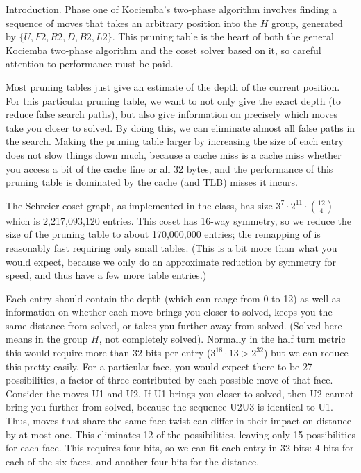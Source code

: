 
\def\mod{\mathop{mod}}


Introduction.
Phase one of Kociemba's two-phase algorithm involves finding a
sequence of moves that takes an arbitrary position into the $H$ group,
generated by $\{U,F2,R2,D,B2,L2\}$.  This pruning table is the heart
of both the general Kociemba two-phase algorithm and the coset solver
based on it, so careful attention to performance must be paid.

Most pruning tables just give an estimate of the depth of the current
position.  For this particular pruning table, we want to not only give
the exact depth (to reduce false search paths), but also give
information on precisely which moves take you closer to solved.  By
doing this, we can eliminate almost all false paths in the search.
Making the pruning table larger by increasing the size of each entry
does not slow things down much, because a cache miss is a cache miss
whether you access a bit of the cache line or all 32 bytes, and the
performance of this pruning table is dominated by the cache (and TLB)
misses it incurs.

The Schreier coset graph, as implemented in the  class, has
size $3^7\cdot 2^{11}\cdot{12\choose 4}$ which is 2,217,093,120
entries.  This coset has 16-way symmetry, so we reduce the size of the
pruning table to about 170,000,000 entries; the remapping of 
is reasonably fast requiring only small tables.  (This is a bit more
than what you would expect, because we only do an approximate
reduction by symmetry for speed, and thus have a few more table
entries.)

Each entry should contain the depth (which can range from 0 to 12) as
well as information on whether each move brings you closer to solved,
keeps you the same distance from solved, or takes you further away
from solved.  (Solved here means in the group $H$, not completely
solved).  Normally in the half turn metric this would require more
than 32 bits per entry
($3^{18}\cdot 13>2^{32}$) but we can reduce this pretty easily.  For a
particular face, you would expect there to be 27 possibilities, a
factor of three contributed by each possible move of that face.
Consider the moves U1 and U2.  If U1 brings you closer to solved, then
U2 cannot bring you further from solved, because the sequence U2U3 is
identical to U1.  Thus, moves that share the same face twist can
differ in their impact on distance by at most one.  This eliminates 12
of the possibilities, leaving only 15 possibilities for each face.
This requires four bits, so we can fit each entry in 32 bits: 4 bits
for each of the six faces, and another four bits for the distance.

